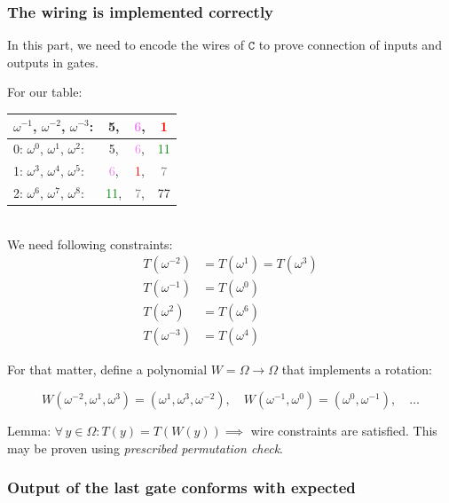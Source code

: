 \documentclass[../lecture-notes.tex]{subfiles}
\begin{document}
\subsubsection{The wiring is implemented correctly}
In this part, we need to encode the wires of \(\texttt{C}\) to prove connection of inputs and outputs in gates. 

\begin{example}
For our table:
\begin{tabular}{l ccc}
  $\omega^{-1}$, $\omega^{-2}$, $\omega^{-3}$: & 5, & \textcolor{violet}{6}, & \textcolor{red}{1} \\ \hline
  0: $\omega^{0}$, $\omega^{1}$, $\omega^{2}$: & 5, & \textcolor{violet}{6}, & \textcolor{green}{11} \\
  1: $\omega^{3}$, $\omega^{4}$, $\omega^{5}$: & \textcolor{violet}{6}, & \textcolor{red}{1}, & \textcolor{gray}{7} \\
  2: $\omega^{6}$, $\omega^{7}$, $\omega^{8}$: & \textcolor{green}{11}, & \textcolor{gray}{7}, & 77 \\ 
\end{tabular}
\\
We need following constraints:
\begin{align}
    T(\omega^{-2}) &= T(\omega^{1}) = T(\omega^{3}) \\
    T(\omega^{-1}) &= T(\omega^{0}) \\
    T(\omega^{2})  &= T(\omega^{6}) \\
    T(\omega^{-3}) &= T(\omega^{4})
\end{align}

For that matter, define a polynomial \(W = \Omega \to \Omega\) that implements a rotation:

\[W(\omega^{-2}, \omega^{1}, \omega^{3}) = (\omega^{1}, \omega^{3}, \omega^{-2}), \quad W(\omega^{-1}, \omega^{0}) = (\omega^{0}, \omega^{-1}), \quad \dots\]

\end{example}

\begin{lemma}
Lemma: \(\forall \, y \in \Omega : T(y) = T(W(y)) \implies\) wire constraints are satisfied. This may be proven using \textit{prescribed permutation check}.
\end{lemma}

\subsubsection{Output of the last gate conforms with expected}
\end{document}
